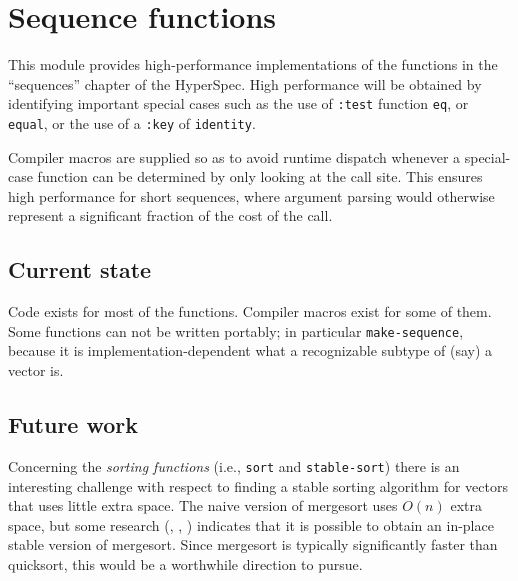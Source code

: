 \chapter{Sequence functions}

This module provides high-performance implementations of the
functions in the ``sequences'' chapter of the HyperSpec.  High
performance will be obtained by identifying important special cases
such as the use of \texttt{:test} function \texttt{eq}, or
\texttt{equal}, or the use of a \texttt{:key} of \texttt{identity}. 

Compiler macros are supplied so as to avoid runtime dispatch
whenever a special-case function can be determined by only looking at
the call site.  This ensures high performance for short sequences,
where argument parsing would otherwise represent a significant
fraction of the cost of the call.

\section{Current state}

Code exists for most of the functions.  Compiler macros exist for some
of them.  Some functions can not be written portably; in particular
\texttt{make-sequence}, because it is implementation-dependent what a
recognizable subtype of (say) a vector is.

\section{Future work}

Concerning the \emph{sorting functions} (i.e., \texttt{sort} and
\texttt{stable-sort}) there is an interesting challenge with respect
to finding a stable sorting algorithm for vectors that uses little
extra space.  The naive version of mergesort uses $O(n)$ extra space,
but some research (\cite{Huang:1990:FSM:898863},
\cite{Huang:1988:PIM:42392.42403},
\cite{Katajainen:1996:PIM:642136.642138}) indicates that it is
possible to obtain an in-place stable version of mergesort.   Since
mergesort is typically significantly faster than quicksort, this would
be a worthwhile direction to pursue.


